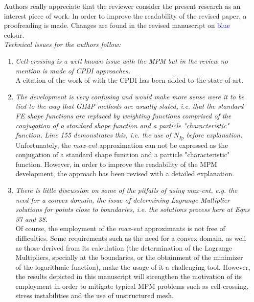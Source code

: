 \documentclass[12pt]{article}
\begin{document}
Authors really appreciate that the reviewer consider the present research as an interest piece of work. In order to improve the readability of the revised paper, a proofreading is made. Changes are found in the revised manuscript on \textcolor{blue}{blue} colour.\\

\textit{Technical issues for the authors follow:}
 \begin{enumerate}
\item \textit{Cell-crossing is a well known issue with the MPM but in the review no mention is made of CPDI approaches.}\\

A citation of the work of \cite{Sadeghirad_2011} with the CPDI has been added to the state of art.

\item \textit{The development is very confusing and would make more sense were it to be tied to 
the way that GIMP methods are usually stated, i.e. that the standard FE shape functions are replaced by weighting functions comprised of the conjugation of a standard shape function and a particle "characteristic" function. Line 155 demonstrates this, i.e. the use of $N_{Ip}$ before explanation.}\\

Unfortunately, the \textit{max-ent} approximation can not be expressed as the conjugation of a standard shape function and a particle "characteristic" function. However, in order to improve the readability of the MPM development, the approach has been revised with a detailed explanation.

\item \textit{There is little discussion on some of the pitfalls of using max-ent, e.g. the need for a convex domain, the issue of determining Lagrange Multiplier solutions for points close to boundaries, i.e. the solutions process here at Eqns 37 and 38.}\\

Of course, the employment of the \textit{max-ent} approximants is not free of difficulties. Some requirements such as the need for a convex domain, as well as those derived from its calculation (the determination of the Lagrange Multipliers, specially at the boundaries, or the obtainment of the minimizer of the logarithmic function), make the usage of it a challenging tool. However, the results depicted in this manuscript will strengthen the motivation of its employment in order to mitigate typical MPM problems such as cell-crossing, stress instabilities and the use of unstructured mesh.  


\end{enumerate}
\end{document}
